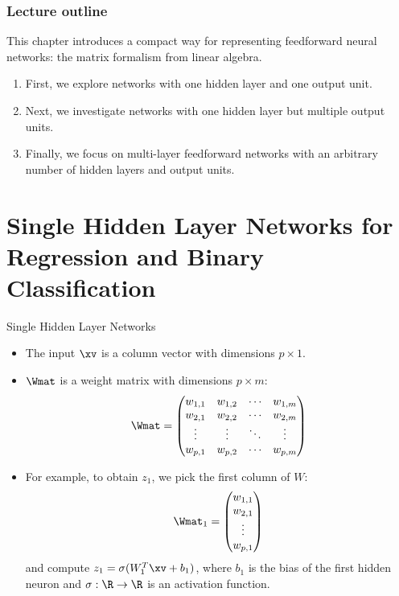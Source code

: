 







\begin{frame}
\frametitle{Lecture outline}
\lz
This chapter introduces a compact way for representing feedforward neural networks: the matrix formalism from linear algebra.
\lz
\lz

\begin{enumerate}
\item First, we explore networks with one hidden layer and one output unit.
\lz
\item Next, we investigate networks with one hidden layer but multiple output units.
\lz
\item Finally, we focus on multi-layer feedforward networks with an arbitrary number of hidden layers and output units.
\end{enumerate}
\end{frame}

\section{Single Hidden Layer Networks for Regression and Binary Classification}

\begin{vbframe}{Single Hidden Layer Networks}

\begin{itemize}
\item The input $\xv$ is a column vector with dimensions $p \times 1$. 
\item $\Wmat$ is a weight matrix with dimensions $p \times m$:
$$\Wmat =
     \begin{pmatrix}
      w_{1,1} & w_{1,2} & \cdots & w_{1,m} \\
      w_{2,1} & w_{2,2} & \cdots & w_{2,m} \\
      \vdots  & \vdots  & \ddots & \vdots  \\
      w_{p,1} & w_{p,2} & \cdots & w_{p,m}
     \end{pmatrix}$$
\item For example, to obtain $z_1$, we pick the first column of $W$:
    $$\Wmat_1 =
     \begin{pmatrix}
      w_{1,1} \\
      w_{2,1} \\
      \vdots  \\
      w_{p,1}
     \end{pmatrix}$$
and compute $z_1 = \sigma(W_1^T \xv + b_1)$, where $b_1$ is the bias of the first hidden neuron and $\sigma: \R \to \R$ is an activation function. 
\end{itemize}
\end{vbframe}

